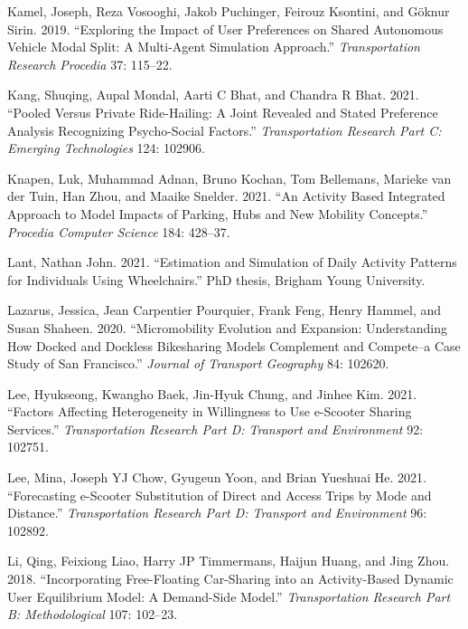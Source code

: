 \documentclass[12pt, oneside, openright]{byuthesis}
\newlength{\cslhangindent}
\newlength{\cslentryspacingunit} %
\newenvironment{CSLReferences}[2] %
 {%
  \setlength{\parindent}{0pt}
  \ifodd #1
  \let\oldpar\par
  \def\par{\hangindent=\cslhangindent\oldpar}
  \fi
  \setlength{\parskip}{#2\cslentryspacingunit}
 }%
 {}
\begin{document}
\begin{CSLReferences}{1}{0}
\leavevmode{}%
Kamel, Joseph, Reza Vosooghi, Jakob Puchinger, Feirouz Ksontini, and Göknur Sirin. 2019. {``Exploring the Impact of User Preferences on Shared Autonomous Vehicle Modal Split: A Multi-Agent Simulation Approach.''} \emph{Transportation Research Procedia} 37: 115--22.

\leavevmode{}%
Kang, Shuqing, Aupal Mondal, Aarti C Bhat, and Chandra R Bhat. 2021. {``Pooled Versus Private Ride-Hailing: A Joint Revealed and Stated Preference Analysis Recognizing Psycho-Social Factors.''} \emph{Transportation Research Part C: Emerging Technologies} 124: 102906.

\leavevmode{}%
Knapen, Luk, Muhammad Adnan, Bruno Kochan, Tom Bellemans, Marieke van der Tuin, Han Zhou, and Maaike Snelder. 2021. {``An Activity Based Integrated Approach to Model Impacts of Parking, Hubs and New Mobility Concepts.''} \emph{Procedia Computer Science} 184: 428--37.

\leavevmode{}%
Lant, Nathan John. 2021. {``Estimation and Simulation of Daily Activity Patterns for Individuals Using Wheelchairs.''} PhD thesis, Brigham Young University.

\leavevmode{}%
Lazarus, Jessica, Jean Carpentier Pourquier, Frank Feng, Henry Hammel, and Susan Shaheen. 2020. {``Micromobility Evolution and Expansion: Understanding How Docked and Dockless Bikesharing Models Complement and Compete--a Case Study of San Francisco.''} \emph{Journal of Transport Geography} 84: 102620.

\leavevmode{}%
Lee, Hyukseong, Kwangho Baek, Jin-Hyuk Chung, and Jinhee Kim. 2021. {``Factors Affecting Heterogeneity in Willingness to Use e-Scooter Sharing Services.''} \emph{Transportation Research Part D: Transport and Environment} 92: 102751.

\leavevmode{}%
Lee, Mina, Joseph YJ Chow, Gyugeun Yoon, and Brian Yueshuai He. 2021. {``Forecasting e-Scooter Substitution of Direct and Access Trips by Mode and Distance.''} \emph{Transportation Research Part D: Transport and Environment} 96: 102892.

\leavevmode{}%
Li, Qing, Feixiong Liao, Harry JP Timmermans, Haijun Huang, and Jing Zhou. 2018. {``Incorporating Free-Floating Car-Sharing into an Activity-Based Dynamic User Equilibrium Model: A Demand-Side Model.''} \emph{Transportation Research Part B: Methodological} 107: 102--23.


\end{CSLReferences}
\end{document}

